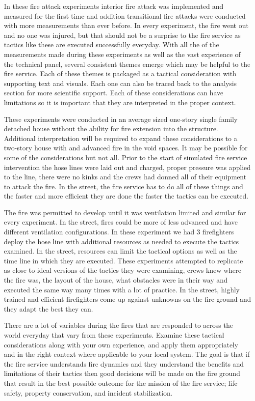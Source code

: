 \documentclass[12pt,oneside]{book}
\begin{document}
In these fire attack experiments interior fire attack was implemented and measured for the first time and addition transitional fire attacks were conducted with more measurements than ever before.  In every experiment, the fire went out and no one was injured, but that should not be a surprise to the fire service as tactics like these are executed successfully everyday.  With all the of the measurements made during these experiments as well as the vast experience of the technical panel, several consistent themes emerge which may be helpful to the fire service. Each of these themes is packaged as a tactical consideration with supporting text and visuals. Each one can also be traced back to the analysis section for more scientific support. Each of these considerations can have limitations so it is important that they are interpreted in the proper context.  

These experiments were conducted in an average sized one-story single family detached house without the ability for fire extension into the structure.  Additional interpretation will be required to expand these considerations to a two-story house with and advanced fire in the void spaces. It may be possible for some of the considerations but not all.  Prior to the start of simulated fire service intervention the hose lines were laid out and charged, proper pressure was applied to the line, there were no kinks and the crews had donned all of their equipment to attack the fire. In the street, the fire service has to do all of these things and the faster and more efficient they are done the faster the tactics can be executed. 

The fire was permitted to develop until it was ventilation limited and similar for every experiment. In the street, fires could be more of less advanced and have different ventilation configurations. In these experiment we had 3 firefighters deploy the hose line with additional resources as needed to execute the tactics examined. In the street, resources can limit the tactical options as well as the time line in which they are executed. These experiments attempted to replicate as close to ideal versions of the tactics they were examining, crews knew where the fire was, the layout of the house, what obstacles were in their way and executed the same way many times with a lot of practice. In the street, highly trained and efficient firefighters come up against unknowns on the fire ground and they adapt the best they can.

There are a lot of variables during the fires that are responded to across the world everyday that vary from these experiments.  Examine these tactical considerations along with your own experience, and apply them appropriately and in the right context where applicable to your local system. The goal is that if the fire service understands fire dynamics and they understand the benefits and limitations of their tactics then good decisions will be made on the fire ground that result in the best possible outcome for the mission of the fire service; life safety, property conservation, and incident stabilization.  
\end{document}
